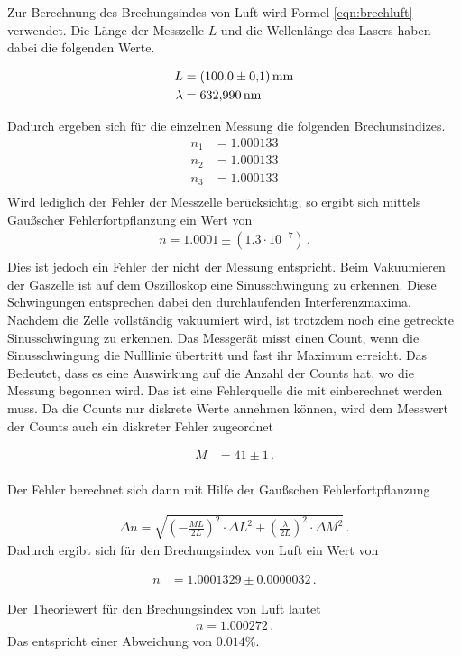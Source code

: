 Zur Berechnung des Brechungsindes von Luft wird Formel \ref{eqn:brechluft}
verwendet. Die Länge der Messzelle $L$ und die Wellenlänge des Lasers
haben dabei die folgenden Werte.

\begin{align*}
  L &= \SI{100 \pm 0.1}{\milli\meter} \\
  \lambda &= \SI{632.990}{\nano\meter} \\
\end{align*}

Dadurch ergeben sich für die einzelnen Messung die folgenden Brechunsindizes.
\begin{align*}
  n_1 &= 1.000133 \\
  n_2 &= 1.000133 \\
  n_3 &= 1.000133 \\
\end{align*}
Wird lediglich der Fehler der Messzelle berücksichtig, so ergibt sich mittels
Gaußscher Fehlerfortpflanzung ein Wert von
\begin{align*}
  n = 1.0001 \pm (1.3 \cdot 10^{-7}) \, .\\
\end{align*}
Dies ist jedoch ein Fehler der nicht der Messung entspricht. Beim Vakuumieren
der Gaszelle ist auf dem Oszilloskop eine Sinusschwingung zu erkennen. Diese
Schwingungen entsprechen dabei den durchlaufenden Interferenzmaxima. Nachdem
die Zelle vollständig vakuumiert wird, ist trotzdem noch eine getreckte
Sinusschwingung zu erkennen. Das Messgerät misst einen Count, wenn die
Sinusschwingung die Nulllinie übertritt und fast ihr Maximum erreicht. Das
Bedeutet, dass es eine Auswirkung auf die Anzahl der Counts hat, wo die
Messung begonnen wird. Das ist eine Fehlerquelle die mit einberechnet werden
muss. Da die Counts nur diskrete Werte annehmen können, wird dem Messwert
der Counts auch ein diskreter Fehler zugeordnet

\begin{align*}
  M &= 41 \pm 1 \, .\\
\end{align*}

Der Fehler berechnet sich dann mit Hilfe der Gaußschen Fehlerfortpflanzung

\begin{align*}
  \Delta{n} = \sqrt{\left( -\frac{M L}{2L} \right)^2 \cdot \Delta{L}^2
  + \left(\frac{\lambda}{2 L} \right)^2 \cdot \Delta{M}^2} \, .
\end{align*}
Dadurch ergibt sich für den Brechungsindex von Luft ein Wert von

\begin{align*}
n &= 1.0001329 \pm 0.0000032 \, .
\end{align*}

Der Theoriewert für den Brechungsindex von Luft lautet
\begin{align*}
  n = 1.000272 \, .
\end{align*}
Das entspricht einer Abweichung von $0.014 \%$.

